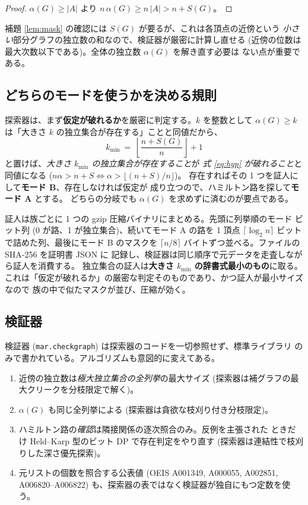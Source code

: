 \documentclass[paper=a4,fontsize=10.5pt,jafontsize=10.5pt]{jlreq}
\theoremstyle{plain}
\theoremstyle{definition}
\begin{document}
\begin{proof}
$\alpha(G) \ge |A|$ より $n\,\alpha(G) \ge n\,|A| > n + S(G)$。
\end{proof}

補題 \ref{lem:mask} の確認には $S(G)$ が要るが、これは各頂点の近傍という
\emph{小さい}部分グラフの独立数の和なので、検証器が厳密に計算し直せる
(近傍の位数は最大次数以下である)。全体の独立数 $\alpha(G)$ を解き直す必要は
ない点が重要である。

\subsection{どちらのモードを使うかを決める規則}

探索器は、まず\textbf{仮定が破れるか}を厳密に判定する。$k$ を整数として
$\alpha(G) \ge k$ は「大きさ $k$ の独立集合が存在する」ことと同値だから、
\[ k_{\min} \ = \ \left\lfloor \frac{n + S(G)}{n} \right\rfloor + 1 \]
と置けば、\emph{大きさ $k_{\min}$ の独立集合が存在すること}が
\emph{式 \eqref{eq:hyp} が破れること}と同値になる
($n\alpha > n+S \iff \alpha > \lfloor (n+S)/n \rfloor$)。
存在すればその 1 つを証人にして\textbf{モード B}、存在しなければ仮定が
成り立つので、ハミルトン路を探して\textbf{モード A} とする。
どちらの分岐でも $\alpha(G)$ を求めずに済むのが要点である。

証人は族ごとに 1 つの gzip 圧縮バイナリにまとめる。先頭に列挙順のモード
ビット列 (0 が路、1 が独立集合)、続いてモード A の路を 1 頂点
$\lceil \log_2 n \rceil$ ビットで詰めた列、最後にモード B のマスクを
$\lceil n/8 \rceil$ バイトずつ並べる。ファイルの SHA-256 を証明書 JSON に
記録し、検証器は同じ順序で元データを走査しながら証人を消費する。
独立集合の証人は\textbf{大きさ $k_{\min}$ の辞書式最小のもの}に取る。
これは「仮定が破れるか」の厳密な判定そのものであり、かつ証人が最小サイズなので
族の中で似たマスクが並び、圧縮が効く。

\subsection{検証器}

検証器 (\texttt{mar.checkgraph}) は探索器のコードを一切参照せず、標準ライブラリ
のみで書かれている。アルゴリズムも意図的に変えてある。

\begin{enumerate}
\item 近傍の独立数は\emph{極大独立集合の全列挙}の最大サイズ
      (探索器は補グラフの最大クリークを分枝限定で解く)。
\item $\alpha(G)$ も同じ全列挙による (探索器は貪欲な枝刈り付き分枝限定)。
\item ハミルトン路の\emph{確認}は隣接関係の逐次照合のみ。反例を主張された
      ときだけ Held--Karp 型のビット DP で存在判定をやり直す
      (探索器は連結性で枝刈りした深さ優先探索)。
\item 元リストの個数を照合する公表値 (OEIS A001349, A000055, A002851,
      A006820--A006822) も、探索器の表ではなく検証器が独自にもつ定数を使う。
\end{enumerate}
\end{document}
